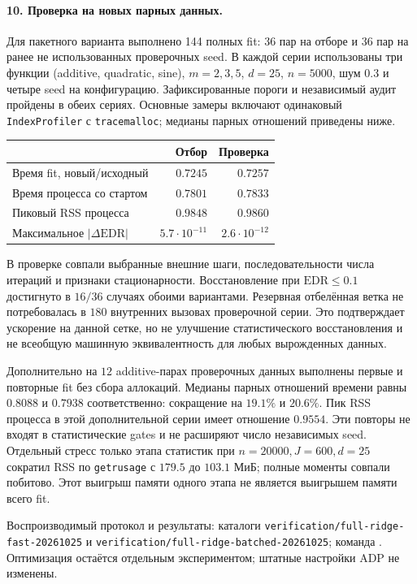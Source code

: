 \documentclass[11pt,a4paper]{article}
\newcommand{\code}[1]{\nolinkurl{#1}}
\begin{document}
\paragraph{10. Проверка на новых парных данных.}
Для пакетного варианта выполнено 144 полных fit: 36 пар на отборе и
36 пар на ранее не использованных проверочных seed. В каждой серии
использованы три функции (additive, quadratic, sine), $m=2,3,5$,
$d=25$, $n=5000$, шум $0.3$ и четыре seed на конфигурацию.
Зафиксированные пороги и независимый аудит пройдены в обеих сериях.
Основные замеры включают одинаковый \code{IndexProfiler} с
\code{tracemalloc}; медианы парных отношений приведены ниже.
\begin{center}
\begin{tabular}{lrr}
 & Отбор & Проверка\\\hline
Время fit, новый/исходный & $0.7245$ & $0.7257$\\
Время процесса со стартом & $0.7801$ & $0.7833$\\
Пиковый RSS процесса & $0.9848$ & $0.9860$\\
Максимальное $|\Delta\mathrm{EDR}|$ & $5.7\cdot10^{-11}$ & $2.6\cdot10^{-12}$
\end{tabular}
\end{center}
В проверке совпали выбранные внешние шаги, последовательности числа
итераций и признаки стационарности. Восстановление при
$\mathrm{EDR}\le0.1$ достигнуто в $16/36$ случаях обоими вариантами.
Резервная отбелённая ветка не потребовалась в $180$ внутренних вызовах
проверочной серии. Это подтверждает ускорение на данной сетке, но не
улучшение статистического восстановления и не всеобщую машинную
эквивалентность для любых вырожденных данных.

Дополнительно на $12$ additive-парах проверочных данных выполнены первые
и повторные fit без сбора аллокаций. Медианы парных отношений времени
равны $0.8088$ и $0.7938$ соответственно: сокращение на $19.1\%$ и
$20.6\%$. Пик RSS процесса в этой дополнительной серии имеет отношение
$0.9554$. Эти повторы не входят в статистические gates и не расширяют
число независимых seed. Отдельный стресс только этапа статистик при
$n=20000,J=600,d=25$ сократил RSS по \code{getrusage}
с $179.5$ до $103.1$ МиБ; полные моменты совпали побитово.
Этот выигрыш памяти одного этапа не является выигрышем памяти всего fit.

\smallskip
{\small Воспроизводимый протокол и результаты: каталоги
\code{verification/full-ridge-fast-20261025} и
\code{verification/full-ridge-batched-20261025}; команда
\texttt{}.
Оптимизация остаётся отдельным экспериментом; штатные настройки ADP
не изменены.}
\end{document}
